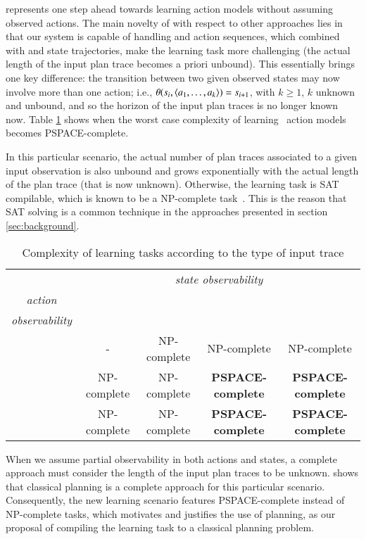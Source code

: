 \FAMA represents one step ahead towards learning action models without assuming observed actions. The main novelty of \FAMA with respect to other approaches lies in that our system is capable of handling \PO and \NO action sequences, which combined with \PO and \NO state trajectories, make the learning task more challenging (the actual length of the input plan trace becomes a priori unbound). This essentially brings one key difference: the transition between two given observed states may now involve more than one action; i.e., $\theta(s_i,{\langle a_1,\ldots,a_k \rangle})=s_{i+1}$, with $k \geq 1$, $k$ unknown and unbound, and so the horizon of the input plan traces is no longer known now. Table \ref{tab:complex} shows when the worst case complexity of learning \strips\ action models becomes PSPACE-complete.  

In this particular scenario, the actual number of plan traces associated to a given input observation is also unbound and grows exponentially with the actual length of the plan trace (that is now unknown). Otherwise, the learning task is SAT compilable, which is known to be a NP-complete task~\cite{russell2016artificial}. This is the reason that SAT solving is a common technique in the approaches presented in section \ref{sec:background}.


\begin{table}[ht]
\centering
\begin{tabular}{c|c|c|c|c|}
	& \multicolumn{4}{c|}{\emph{state observability}} \\ \cline{2-5}
	\multirow{1}{*}{\emph{action}} & \FO & \POstar & \PO & \NO\\ {\emph{observability}} & & & & \\ \hline
	\FO & - & NP-complete & NP-complete & NP-complete \\ \hline
	\PO & NP-complete & NP-complete & \textbf{PSPACE-complete} & \textbf{PSPACE-complete} \\ \hline
	\NO & NP-complete & NP-complete & \textbf{PSPACE-complete} & \textbf{PSPACE-complete} \\ \hline
\end{tabular}
\caption{Complexity of learning tasks according to the type of input trace}
\label{tab:complex}
\end{table}


When we assume partial observability in both actions and states, a complete approach must consider the length of the input plan traces to be unknown. \FAMA shows that classical planning is a complete approach for this particular scenario. Consequently, the new learning scenario features PSPACE-complete instead of NP-complete tasks, which motivates and justifies the use of planning, as our proposal of compiling the learning task to a classical planning problem.

